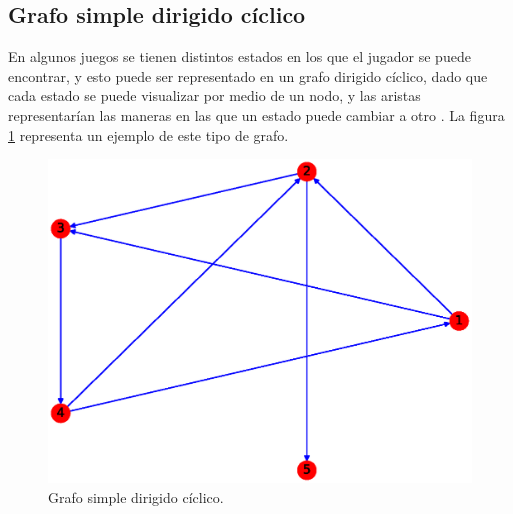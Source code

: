 \documentclass{article}
\begin{document}
\subsection{Grafo simple dirigido cíclico}
En algunos juegos se tienen distintos estados en los que el jugador se puede encontrar, y esto puede ser representado en un grafo dirigido cíclico, dado que cada estado se puede visualizar por medio de un nodo, y las aristas representarían las maneras en las que un estado puede cambiar a otro \cite{GSDA}. La figura \ref{fig:GSDC} representa un ejemplo de este tipo de grafo.
\begin{figure}[H]
    \includegraphics[width=\textwidth]{5-GSDC}
    \caption{Grafo simple dirigido cíclico.}
    \label{fig:GSDC}
\end{figure}
\end{document}
